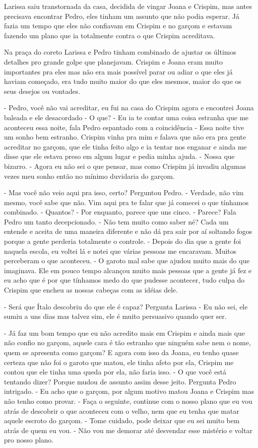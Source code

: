 Larissa saiu transtornada da casa, decidida de vingar Joana e Crispim, mas antes precisava encontrar Pedro, eles tinham um assunto que não podia esperar. Já fazia um tempo que eles não confiavam em Crispim e no garçom e estavam fazendo um plano que ia totalmente contra o que Crispim acreditava.

Na praça do coreto Larissa e Pedro tinham combinado de ajustar os últimos detalhes pro grande golpe que planejavam. Crispim e Joana eram muito importantes pra eles mas não era mais possível parar ou adiar o que eles já haviam começado, era tudo muito maior do que eles mesmos, maior do que os seus desejos ou vontades.

- Pedro, você não vai acreditar, eu fui na casa do Crispim agora e encontrei Joana baleada e ele desacordado
- O que?
- Eu ia te contar uma coisa estranha que me aconteceu essa noite, fala Pedro espantado com a coincidência
- Essa noite tive um sonho bem estranho. Crispim vinha pra mim e falava que não era pra gente acreditar no garçom, que ele tinha feito algo e ia tentar nos enganar e ainda me disse que ele estava preso em algum lugar e pedia minha ajuda.
- Nossa que bizarro.
- Agora eu não sei o que pensar, mas como Crispim já invadiu algumas vezes meu sonho então no mínimo duvidaria do garçom.

- Mas você não veio aqui pra isso, certo? Perguntou Pedro.
- Verdade, não vim mesmo, você sabe que não. Vim aqui pra te falar que já comecei o que tínhamos combinado.
- Quantos?
- Por enquanto, parece que uns cinco.
- Parece? Fala Pedro um tanto decepcionado.
- Não tem muito como saber né? Cada um entende e aceita de uma maneira diferente e não dá pra sair por aí soltando fogos porque a gente perderia totalmente o controle.
- Depois do dia que a gente foi naquela escola, eu voltei lá e notei que várias pessoas me encaravam. Muitos perceberam o que aconteceu.
- O garoto mal sabe que ajudou muito mais do que imaginava. Ele em pouco tempo alcançou muito mais pessoas que a gente já fez e eu acho que é por que tínhamos medo do que pudesse acontecer, tudo culpa do Crispim que encheu as nossas cabeças com as idéias dele.

- Será que Ítalo descobriu do que ele é capaz? Pergunta Larissa
- Eu não sei, ele sumiu a uns dias mas talvez sim, ele é muito persuasivo quando quer ser.

- Já faz um bom tempo que eu não acredito mais em Crispim e ainda mais que não confio no garçom, aquele cara é tão estranho que ninguém sabe nem o nome, quem se apresenta como garçom? E agora com isso da Joana, eu tenho quase certeza que não foi o garoto que matou, ele tinha afeto por ela, Crispim me contou que ele tinha uma queda por ela, não faria isso.
- O que você está tentando dizer? Porque mudou de assunto assim desse jeito. Pergunta Pedro intrigado.
- Eu acho que o garçom, por algum motivo matou Joana e Crispim  mas não tenho como provar.
- Faça o seguinte, continue com o nosso plano que eu vou atrás de descobrir o que aconteceu com o velho, nem que eu tenha que matar aquele escroto do garçom.
- Tome cuidado, pode deixar que eu sei muito bem atrás de quem eu vou.
- Não vou me demorar até desvendar esse mistério e voltar pro nosso plano.